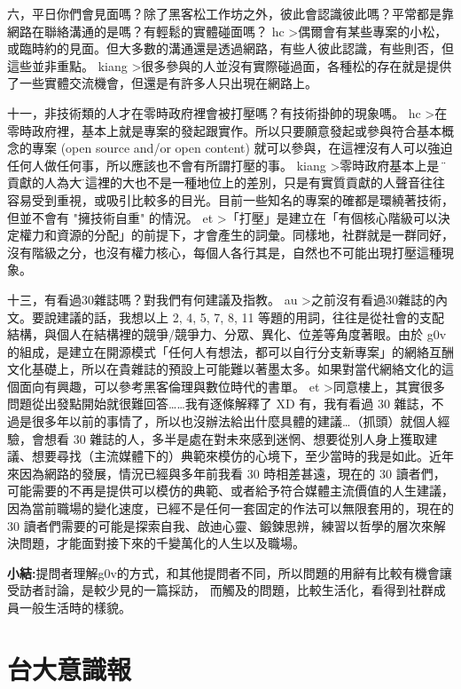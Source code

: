 六，平日你們會見面嗎？除了黑客松工作坊之外，彼此會認識彼此嗎？平常都是靠網路在聯絡溝通的是嗎？有輕鬆的實體碰面嗎？
hc \textgreater 偶爾會有某些專案的小松，或臨時約的見面。但大多數的溝通還是透過網路，有些人彼此認識，有些則否，但這些並非重點。
kiang \textgreater 很多參與的人並沒有實際碰過面，各種松的存在就是提供了一些實體交流機會，但還是有許多人只出現在網路上。

十一，非技術類的人才在零時政府裡會被打壓嗎？有技術掛帥的現象嗎。
hc \textgreater 在零時政府裡，基本上就是專案的發起跟實作。所以只要願意發起或參與符合基本概念的專案 (open source and/or open content) 就可以參與，在這裡沒有人可以強迫任何人做任何事，所以應該也不會有所謂打壓的事。
kiang \textgreater 零時政府基本上是 \"有貢獻的人為大\" ，這裡的大也不是一種地位上的差別，只是有實質貢獻的人聲音往往容易受到重視，或吸引比較多的目光。目前一些知名的專案的確都是環繞著技術，但並不會有 "擁技術自重" 的情況。
et \textgreater 「打壓」是建立在「有個核心階級可以決定權力和資源的分配」的前提下，才會產生的詞彙。同樣地，社群就是一群同好，沒有階級之分，也沒有權力核心，每個人各行其是，自然也不可能出現打壓這種現象。

十三，有看過30雜誌嗎？對我們有何建議及指教。
au \textgreater 之前沒有看過30雜誌的內文。要說建議的話，我想以上 2, 4, 5, 7, 8, 11 等題的用詞，往往是從社會的支配結構，與個人在結構裡的競爭/競爭力、分眾、異化、位差等角度著眼。由於 g0v 的組成，是建立在開源模式「任何人有想法，都可以自行分支新專案」的網絡互酬文化基礎上，所以在貴雜誌的預設上可能難以著墨太多。如果對當代網絡文化的這個面向有興趣，可以參考黑客倫理與數位時代的書單。
et \textgreater 同意樓上，其實很多問題從出發點開始就很難回答……我有逐條解釋了 XD 有，我有看過 30 雜誌，不過是很多年以前的事情了，所以也沒辦法給出什麼具體的建議…（抓頭）就個人經驗，會想看 30 雜誌的人，多半是處在對未來感到迷惘、想要從別人身上獲取建議、想要尋找（主流媒體下的）典範來模仿的心境下，至少當時的我是如此。近年來因為網路的發展，情況已經與多年前我看 30 時相差甚遠，現在的 30 讀者們，可能需要的不再是提供可以模仿的典範、或者給予符合媒體主流價值的人生建議，因為當前職場的變化速度，已經不是任何一套固定的作法可以無限套用的，現在的 30 讀者們需要的可能是探索自我、啟迪心靈、鍛鍊思辨，練習以哲學的層次來解決問題，才能面對接下來的千變萬化的人生以及職場。

\textbf{小結:}提問者理解g0v的方式，和其他提問者不同，所以問題的用辭有比較有機會讓受訪者討論，是較少見的一篇採訪，
而觸及的問題，比較生活化，看得到社群成員一般生活時的樣貌。

\section{台大意識報}

